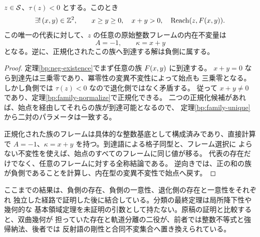 \begin{theorem}[負側の一意分類]
\label{bp:neg-classification}
\leanok
\(z\in\mathcal S\)、\(\tau(z)<0\) とする。このとき
\[
 \exists!\,(x,y)\in\mathbb Z^2,
 \qquad x\ge y\ge0,\quad x+y>0,\quad\operatorname{Reach}(z,F(x,y)).
\]
この唯一の代表に対して、\(z\) の任意の原始整数フレームの内在不変量は
\[
 A=-1,\qquad\kappa=x+y
\]
となる。逆に、正規化されたこの族へ到達する解は負側に属する。
\end{theorem}
\begin{proof}
\leanok
定理\ref{bp:neg-existence}でまず任意の族 \(F(x,y)\) に到達する。
\(x+y=0\) なら到達先は三乗零であり、冪零性の変異不変性によって始点も
三乗零となる。しかし負側では \(\tau(z)<0\) なので退化側ではなく矛盾する。
従って \(x+y\ne0\) であり、定理\ref{bp:family-normalize}で正規化できる。
二つの正規化候補があれば、始点を経由してそれらの族が到達可能となるので、
定理\ref{bp:family-unique}から二対のパラメータは一致する。

正規化された族のフレームは具体的な整数基底として構成済みであり、直接計算で
\(A=-1\)、\(\kappa=x+y\) を持つ。到達語による格子同型と、フレーム選択に
よらない不変性を使えば、始点のすべてのフレームに同じ値が移る。
代表の存在だけでなく、任意のフレームに対する全称結論である。
逆向きでは、正の和の族が負側であることを計算し、内在型の変異不変性で始点へ戻す。
\end{proof}

ここまでの結果は、負側の存在、負側の一意性、退化側の存在と一意性をそれぞれ
独立した経路で証明した後に結合している。分類の最終定理は局所降下性や幾何的な
基本領域定理を未証明の引数として持たない。原稿の証明と比較すると、双曲幾何が
担っていた存在と軌道分離の二役が、前者では整数不等式と強帰納法、後者では
反射語の剛性と合同不変集合へ置き換えられている。
